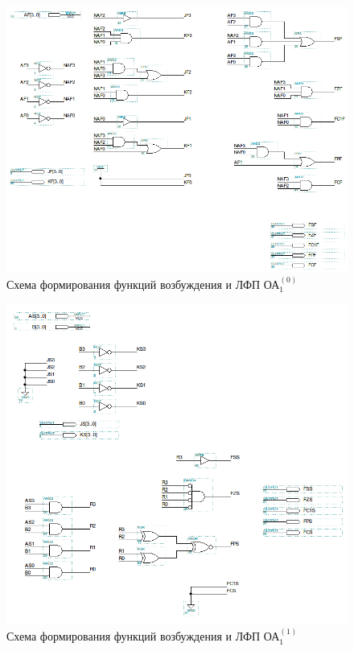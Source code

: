 \begin{figure}[H]
	\includegraphics[scale=0.6]{images/altera/rev2/oa10_logic.png}
	\caption{Схема формирования функций возбуждения и ЛФП ОА$^{(0)}_{1}$}
	\label{figure:oa10log}
\end{figure}

\begin{figure}[H]
	\includegraphics[scale=0.6]{images/altera/rev2/oa11_logic.png}
	\caption{Схема формирования функций возбуждения и ЛФП ОА$^{(1)}_{1}$}
	\label{figure:oa11log}
\end{figure}


